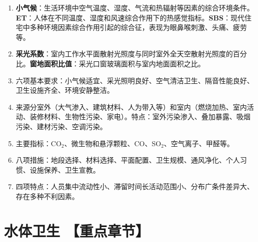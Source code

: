 \documentclass[10pt,a4paper,oneside]{ctexbook}
\begin{document}
\begin{enumerate}[leftmargin=*, itemsep=5pt]
    \item \textbf{小气候}：生活环境中空气温度、湿度、气流和热辐射等因素的综合环境条件。\textbf{ET}：人体在不同温度、湿度和风速综合作用下的热感觉指标。\textbf{SBS}：现代住宅中多种环境因素综合作用引起的综合征，表现为眼鼻喉刺激、头痛、疲劳等。

    \item \textbf{采光系数}：室内工作水平面散射光照度与同时室外全天空散射光照度的百分比。\textbf{窗地面积比值}：采光口窗玻璃面积与室内地面面积之比。

    \item 六项基本要求：小气候适宜、采光照明良好、空气清洁卫生、隔音性能良好、卫生设施齐全、环境安静整洁。

    \item 来源分室外（大气渗入、建筑材料、人为带入等）和室内（燃烧加热、室内活动、装修材料、生物性污染、家电）。特点：室外污染渗入、叠加暴露、吸烟污染、建材污染、空调污染。

    \item 主要指标：CO$_2$、微生物和悬浮颗粒、CO、SO$_2$、空气离子、甲醛等。

    \item 八项措施：地段选择、材料选择、平面配置、卫生规模、通风净化、个人习惯、设施保养、卫生宣教。

    \item 四项特点：人员集中流动性小、滞留时间长活动范围小、分布广条件差异大、存在多种不利因素。
\end{enumerate}

\newpage


\chapter{水体卫生  【重点章节】}
\setcounter{chapter}{5}
\end{document}
